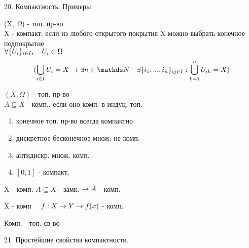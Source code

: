 \documentclass[11pt, fleqn]{article}
\begin{document}
    \begin{question}{20. Компактность. Примеры.}
        \begin{definition}
            (X, $\Omega$) - топ. пр-во\\
            X - компакт, если из любого открытого покрытия X можно выбрать конечное подпокрытие\\
            $\forall \{U_i\}_{i \in I},\quad U_i \in \Omega$\\
            \[(\bigcup_{i \in I}U_i = X \ra \exists n \in \N \q \exists \{i_1, ..., i_n\}_{ij \in I}:
            \bigcup_{k = 1}^n U_{ik} = X)\]
        \end{definition}

        \begin{definition}
            $(X, \Omega)$ - топ. пр-во\\
            $A \subseteq X$ - комп., если оно комп. в индуц. топ.
        \end{definition}

        \begin{theorem}
            \begin{enumerate}
                \item конечное топ. пр-во всегда компактно
                \item дискретное бесконечное множ. не комп.
                \item антидискр. множ. комп.
                \item  $[0, 1]$ - компакт.
            \end{enumerate}
        \end{theorem}

        \begin{theorem}
            X - комп. $A \subseteq X$ - замк. $\rightarrow A$ - комп.
        \end{theorem}

        \begin{theorem}
            X - комп $\quad f:X \rightarrow Y \rightarrow f(x)$ - комп.
        \end{theorem}

        \begin{consequence}
            Комп. - топ. св-во
        \end{consequence}
    \end{question}

    \begin{question}{21. Простейшие свойства компактности.}

    \end{question}
\end{document}
